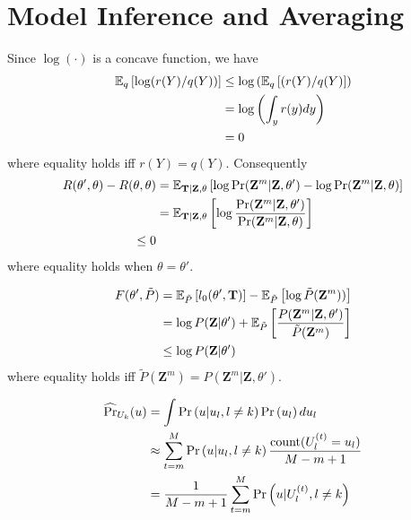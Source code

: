 \chapter{Model Inference and Averaging}
\label{ch:8}

\begin{exercise}
  Since $\log(\cdot)$ is a concave function, we have
  \begin{align}
    \mathbb{E}_q\left[\log(r(Y) / q(Y)) \right] &
    \leq\log\left(\mathbb{E}_q\left[(r(Y) / q(Y)\right]\right) \notag\\
    & = \log\left(\int_yr(y)dy \right) \notag \\
    &= 0
  \end{align}
  where equality holds iff $r(Y) = q(Y)$. Consequently
  \begin{align}
    R(\theta',\theta) - R(\theta, \theta) & =
    \mathbb{E}_{\mathbf{T|\mathbf{Z},\theta}}
    \left[\log\mbox{Pr}(\mathbf{Z}^m|\mathbf{Z},\theta') -
    \log\mbox{Pr}(\mathbf{Z}^m|\mathbf{Z},\theta)\right] \notag\\
    &= \mathbb{E}_{\mathbf{T|\mathbf{Z},\theta}}
    \left[\log\frac{\mbox{Pr}(\mathbf{Z}^m|\mathbf{Z},\theta')}
    {\mbox{Pr}(\mathbf{Z}^m|\mathbf{Z},\theta)} \right] \notag\\
    \leq 0
  \end{align}
  where equality holds when $\theta=\theta'$.
\end{exercise}

\begin{exercise}
  \begin{align}
    F(\theta',\tilde{P}) &= \mathbb{E}_{\tilde{P}}
    \left[l_0(\theta',\mathbf{T})\right] -
    \mathbb{E}_{\tilde{P}}\left[\log\tilde{P}(\mathbf{Z}^m)) \right] \notag\\
    &= \log P(\mathbf{Z}|\theta') +
    \mathbb{E}_{\tilde{P}}\left[\frac{P(\mathbf{Z}^m|\mathbf{Z},\theta')}
    {\tilde{P}(\mathbf{Z}^m)} \right] \notag\\
    &\leq \log P(\mathbf{Z}|\theta')
  \end{align}
  where equality holds iff
  $\tilde{P}(\mathbf{Z}^m)=P(\mathbf{Z}^m|\mathbf{Z},\theta')$.
\end{exercise}

\begin{exercise}
  \begin{align}
    \widehat{\mbox{Pr}}_{U_k}(u) &= \int\mbox{Pr}\left(u|u_l,
    l\not=k\right) \mbox{Pr}\left(u_l\right)du_l \notag\\
    &\approx\sum_{t=m}^M \mbox{Pr}\left(u|u_l,
    l\not=k\right) \frac{\mbox{count}(U_l^{(t)} = u_l)}{M-m+1} \notag\\
    &= \frac{1}{M-m+1} \sum_{t=m}^M \mbox{Pr}\left(u|U_l^{(t)}, l\not=k\right)
  \end{align}
\end{exercise}

